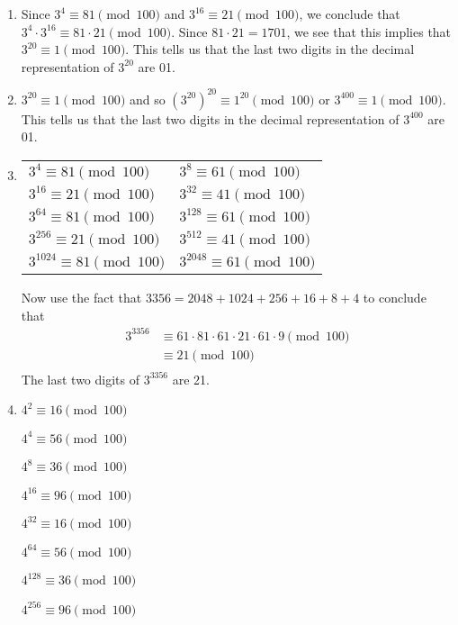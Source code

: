 \begin{enumerate}
\begin{enumerate}
\item Since  $3^4  \equiv 81 \pmod{100}$ and  $3^{16}  \equiv 21 \pmod{100}$, we conclude that  
$3^4  \cdot 3^{16}  \equiv 81 \cdot 21 \pmod{100}$. Since  $81 \cdot 21 = 1701$, we see that this implies that  $3^{20}  \equiv 1 \pmod{100}$. This tells us that the last two digits in the decimal representation of  $3^{20} $ are  01.

\item $3^{20}  \equiv 1 \pmod{100}$ and so  
$\left( {3^{20} } \right)^{20}  \equiv 1^{20} \pmod{100}$  or  
$3^{400}  \equiv 1 \pmod{100}$. This tells us that the last two digits in the decimal representation of  $3^{400} $ are  01.

\item 
\begin{tabular}[t]{l l}
$3^4 \equiv 81 \pmod {100}$ & $3^8 \equiv 61 \pmod {100}$ \\
$3^{16} \equiv 21 \pmod {100}$ & $3^{32} \equiv 41 \pmod {100}$ \\
$3^{64} \equiv 81 \pmod {100}$ & $3^{128} \equiv 61 \pmod{100}$ \\
$3^{256} \equiv 21 \pmod {100}$ & $3^{512} \equiv 41 \pmod {100}$ \\
$3^{1024} \equiv 81 \pmod {100}$ & $3^{2048} \equiv 61 \pmod {100}$ \\
\end{tabular}

Now use the fact that $3356 = 2048 + 1024 + 256 + 16 + 8 + 4$ to conclude that
\[
\begin{aligned}
3^{3356} &\equiv 61 \cdot 81 \cdot 61 \cdot 21 \cdot 61 \cdot 9 \pmod {100} \\
         & \equiv 21 \pmod {100} \\
\end{aligned}
\]
The last two digits of $3^{3356}$ are 21.


\item \begin{multicols}{2}
$4^2  \equiv 16 \pmod{100}$

$4^4  \equiv 56 \pmod{100}$

$4^8  \equiv 36 \pmod{100}$

$4^{16}  \equiv 96 \pmod{100}$

$4^{32}  \equiv 16 \pmod{100}$

$4^{64}  \equiv 56 \pmod{100}$

$4^{128}  \equiv 36 \pmod{100}$

$4^{256}  \equiv 96 \pmod{100}$


\end{multicols}
\end{enumerate}
\end{enumerate}
